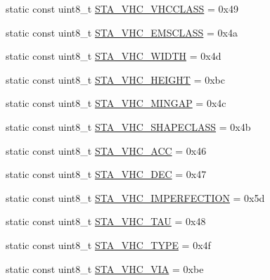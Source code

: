 \begin{DoxyCompactItemize}
\item 
static const uint8\+\_\+t \hyperlink{classtraci__api_1_1_vehicle_manager_a4b6b8a21fb21e6d37165c96faad2bf42}{S\+T\+A\+\_\+\+V\+H\+C\+\_\+\+V\+H\+C\+C\+L\+A\+SS} = 0x49
\item 
static const uint8\+\_\+t \hyperlink{classtraci__api_1_1_vehicle_manager_a26d3c7c5eaa33aeadacffe05d61a062c}{S\+T\+A\+\_\+\+V\+H\+C\+\_\+\+E\+M\+S\+C\+L\+A\+SS} = 0x4a
\item 
static const uint8\+\_\+t \hyperlink{classtraci__api_1_1_vehicle_manager_a60dbed8e67261ea813a06af7eff66fe2}{S\+T\+A\+\_\+\+V\+H\+C\+\_\+\+W\+I\+D\+TH} = 0x4d
\item 
static const uint8\+\_\+t \hyperlink{classtraci__api_1_1_vehicle_manager_a2f0dc714583c0f7577f8464935e7bf7a}{S\+T\+A\+\_\+\+V\+H\+C\+\_\+\+H\+E\+I\+G\+HT} = 0xbc
\item 
static const uint8\+\_\+t \hyperlink{classtraci__api_1_1_vehicle_manager_ae26c5e4015d940da17ebcb55990db55a}{S\+T\+A\+\_\+\+V\+H\+C\+\_\+\+M\+I\+N\+G\+AP} = 0x4c
\item 
static const uint8\+\_\+t \hyperlink{classtraci__api_1_1_vehicle_manager_aa5ba3595345996574b51e72d5f6bd034}{S\+T\+A\+\_\+\+V\+H\+C\+\_\+\+S\+H\+A\+P\+E\+C\+L\+A\+SS} = 0x4b
\item 
static const uint8\+\_\+t \hyperlink{classtraci__api_1_1_vehicle_manager_ab9130691efa04efde88822a7876c330d}{S\+T\+A\+\_\+\+V\+H\+C\+\_\+\+A\+CC} = 0x46
\item 
static const uint8\+\_\+t \hyperlink{classtraci__api_1_1_vehicle_manager_ad2c2a68fe86ebb06c85e989fed90c97f}{S\+T\+A\+\_\+\+V\+H\+C\+\_\+\+D\+EC} = 0x47
\item 
static const uint8\+\_\+t \hyperlink{classtraci__api_1_1_vehicle_manager_aa36ca1986b29b2df2ec054785d18afd5}{S\+T\+A\+\_\+\+V\+H\+C\+\_\+\+I\+M\+P\+E\+R\+F\+E\+C\+T\+I\+ON} = 0x5d
\item 
static const uint8\+\_\+t \hyperlink{classtraci__api_1_1_vehicle_manager_a93d27a387090ce7b8e6b7afc1a9d80b1}{S\+T\+A\+\_\+\+V\+H\+C\+\_\+\+T\+AU} = 0x48
\item 
static const uint8\+\_\+t \hyperlink{classtraci__api_1_1_vehicle_manager_a7b034d47f44d94bea5497357093fc1ce}{S\+T\+A\+\_\+\+V\+H\+C\+\_\+\+T\+Y\+PE} = 0x4f
\item 
static const uint8\+\_\+t \hyperlink{classtraci__api_1_1_vehicle_manager_ae66ccdcffdd1e46ed0edac4e7a33598f}{S\+T\+A\+\_\+\+V\+H\+C\+\_\+\+V\+IA} = 0xbe
\end{DoxyCompactItemize}


